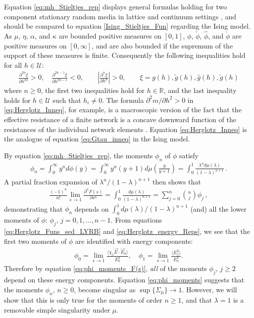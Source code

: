 \documentclass[jmp,graphicx]{revtex4-1}
\newcommand{\ph}{\hat{\phi}}
\begin{document}
%
Equation \eqref{eq:mh_Stieltjes_rep} displays general formulas
holding for two component stationary random media in lattice and
continuum settings \cite{Golden:PRL-3935}, and should be compared to
equation \eqref{Ising_Stieltjes_Fun} regarding the Ising model.       
As $\mu$, $\eta$, $\alpha$, and $\kappa$ are bounded positive measures on
$[0,1]$, $\phi$, $\tilde{\phi}$, $\ph$, and $\check{\phi}$ are positive
measures on $[0,\infty]$, and are also bounded if the supremum of the
support of these measures is finite. Consequently the following
inequalities hold for all $h\in\mathcal{U}$: 
%
\begin{align}\label{eq:Herglotz_Inneq}
  \frac{\partial^{2n}\xi}{\partial h^{2n}}>0, \quad
  \frac{\partial^{2n-1}\xi}{\partial h^{2n-1}}<0, \qquad
  \left|\frac{\partial^n\xi}{\partial h^n}\right|>0, \qquad
  \xi=g(h),\tilde{g}(h),\hat{g}(h),\check{g}(h)
\end{align}
%
where $n\geq0$, the first two inequalities hold for $h\in\mathbb{R}$, and
the last inequality holds for $h\in\mathcal{U}$ such that $h_i\neq0$. The
formula $\partial^2m/\partial h^2>0$ in \eqref{eq:Herglotz_Inneq}, for
example, is a macroscopic version of
the fact that the effective resistance of a finite network is a
concave downward function of the resistances of the individual network
elements \cite{Golden:JMP-5627}. Equation \eqref{eq:Herglotz_Inneq} is
the analogue of equation \eqref{eq:Gtau_inneq} in the Ising model.

By equation \eqref{eq:mh_Stieltjes_rep}, the moments $\phi_n$ of $\phi$
satisfy  
%
\begin{align}\label{eq:phi_moments}
  \phi_n=\int_0^\infty y^nd\phi(y)
    =\int_0^\infty y^n(y+1)d\mu\left(\frac{y}{y+1}\right)
    =\int_0^1\frac{\lambda^nd\mu(\lambda)}{(1-\lambda)^{n+1}}\,.
\end{align}
%
A partial fraction expansion of $\lambda^n/(1-\lambda)^{n+1}$ then shows that
%
\begin{align}\label{eq:phi_moments_F(s)}
  \frac{(-1)^n}{n!}\lim_{s\to1}\frac{\partial^nF(s)}{\partial s^n}=\int_0^1\frac{d\mu(\lambda)}{(1-\lambda)^{n+1}}
                                =\sum_{j=0}^n{n \choose j} \phi_j\,,
\end{align}
%
demonstrating that $\phi_n$ depends on $\int_0^1d\mu(\lambda)/(1-\lambda)^{n+1}$
(and) all the lower moments of $\phi$: $\phi_j$, $j=0,1,\ldots,n-1$.
From equations \eqref{eq:Herglotz_Funs_sed_LYRB} and
\eqref{eq:Herglotz_energy_Reps}, we see that the first two moments of
$\phi$ are identified with energy components:    
%
\begin{align}\label{eq:phi_energy_relations}
  \phi_0=\lim_{s\to1}\frac{\langle\chi_1\vec{E}\cdot\vec{E}_0\rangle}{E_0^2},   \quad
  \phi_1=\lim_{s\to1}\frac{\langle E_f^2\rangle}{E_0^2}.
\end{align}
%
Therefore by equation \eqref{eq:phi_moments_F(s)}, \emph{all} of the
moments $\phi_j$, $j\geq2$ depend on these energy components. Equation
\eqref{eq:phi_moments} suggests that the moments $\phi_n$, $n\geq0$, become
singular as $\sup\{\Sigma_\mu\}\to1$. However, we will show that this is only
true for the moments of order $n\geq1$, and that $\lambda=1$ is a removable
simple singularity under $\mu$. 
\end{document}
